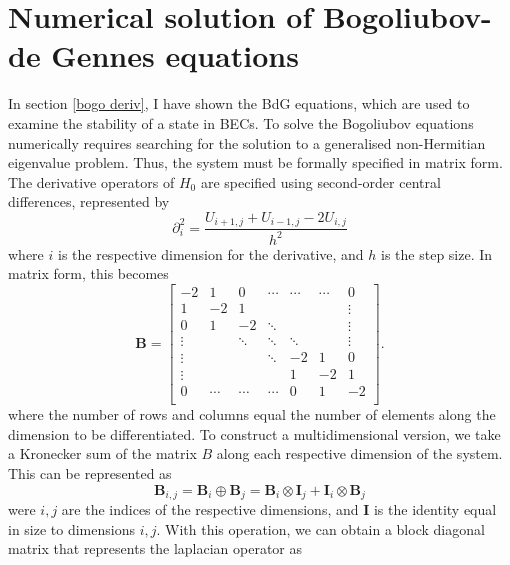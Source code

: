 \section{Numerical solution of Bogoliubov-de Gennes equations}
In section \ref{bogo deriv}, I have shown the BdG equations, which are used to examine the stability of a state in BECs. To solve the Bogoliubov equations numerically requires searching for the solution to a generalised non-Hermitian eigenvalue problem. Thus, the system must be formally specified in matrix form. The derivative operators of $H_0$ are specified using second-order central differences, represented by
\begin{equation}
    \partial^2_i = \frac{U_{i+1,j} + U_{i-1,j} - 2U_{i,j}}{h^2}
\end{equation}
where $i$ is the respective dimension for the derivative, and $h$ is the step size. In matrix form, this becomes
\begin{equation}
    \mathbf{B} =
    \begin{bmatrix}
            -2      &   1    &    0   &  \cdots   &  \cdots   &  \cdots   & 0 \\
            1       &   -2   &    1   &           &           &     &  \vdots \\
            0       &    1   &   -2   & \ddots    &           &     &  \vdots \\
            \vdots  &        & \ddots & \ddots    & {\ddots}  &     &  \vdots \\
            \vdots  &        &        & \ddots    &    -2     &  1  &       0 \\
            \vdots  &        &        &           &     1     & -2  &       1 \\
            0       & \cdots & \cdots & \cdots    &     0     &  1  &      -2 \\
        \end{bmatrix}.
\end{equation}
where the number of rows and columns equal the number of elements along the dimension to be differentiated. To construct a multidimensional version, we take a Kronecker sum of the matrix $B$ along each respective dimension of the system. This can be represented as
\begin{equation}
    \mathbf{B}_{i,j} = \mathbf{B}_i \oplus \mathbf{B}_j = \mathbf{B}_i \otimes \mathbf{I}_j + \mathbf{I}_i \otimes \mathbf{B}_j
\end{equation}
were $i,j$ are the indices of the respective dimensions, and $\mathbf{I}$ is the identity equal in size to dimensions $i,j$. With this operation, we can obtain a block diagonal matrix that represents the laplacian operator as

